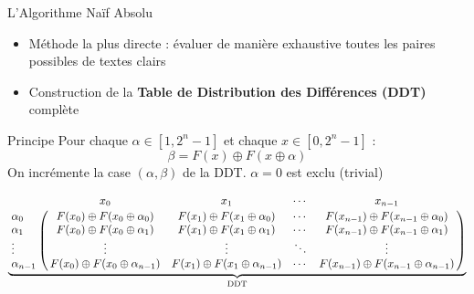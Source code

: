 \documentclass[10pt]{beamer}
\begin{document}
\begin{frame}{L'Algorithme Naïf Absolu} %
    \begin{itemize}
        \item Méthode la plus directe : évaluer de manière exhaustive toutes les paires possibles de textes clairs
        \item Construction de la \textbf{Table de Distribution des Différences (DDT)} complète
    \end{itemize}
 
    \begin{block}{Principe}
        Pour chaque $\alpha \in [1, 2^n - 1]$ et chaque $x \in [0, 2^n - 1]$ : \\
        \begin{equation*}
            \beta = F(x) \oplus F(x \oplus \alpha)
        \end{equation*}
        On incrémente la case $(\alpha, \beta)$ de la DDT. $\alpha = 0$ est exclu (trivial)
    \end{block}

    \footnotesize\[
    \underbrace {
    \bordermatrix{
        & x_0 & x_1 & \cdots & x_{n-1} \cr
        \alpha_0    & F(x_0) \oplus F(x_0 \oplus \alpha_0) & F(x_1) \oplus F(x_1 \oplus \alpha_0) & \cdots & F(x_{n-1}) \oplus F(x_{n-1} \oplus \alpha_0) \cr
        \alpha_1    & F(x_0) \oplus F(x_0 \oplus \alpha_1) & F(x_1) \oplus F(x_1 \oplus \alpha_1) & \cdots & F(x_{n-1}) \oplus F(x_{n-1} \oplus \alpha_1) \cr
        \vdots      & \vdots & \vdots & \ddots & \vdots \cr
        \alpha_{n-1} & F(x_0) \oplus F(x_0 \oplus \alpha_{n-1}) & F(x_1) \oplus F(x_1 \oplus \alpha_{n-1}) & \cdots & F(x_{n-1}) \oplus F(x_{n-1} \oplus \alpha_{n-1}) \cr
    }}_{\text{DDT}}
    \]
\end{frame}
\end{document}
